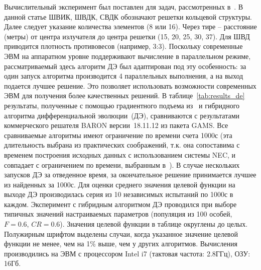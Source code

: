 Вычислительный эксперимент был поставлен для задач, рассмотренных в~\cite{tyu:daor,tyu22:ring}. В данной
статье ШВИК, ШВДК, СВДК обозначают решетки кольцевой структуры. Далее следует указание количества элементов (8 или 16).
Через тире -- расстояние (метры) от центра излучателя до центра решетки (15, 20, 25, 30, 37). Для ШВД приводится плотность противовесов (например, 3:3). Поскольку современные ЭВМ на аппаратном уровне поддерживают вычисление в параллельном режиме, рассматриваемый здесь алгоритм ДЭ был адаптирован под эту особенность: за один запуск алгоритма производится 4 параллельных выполнения, а на выход подается лучшее решение. Это позволяет использовать возможности современных ЭВМ для получения более качественных решений.
В таблице~\ref{tab:results_de} результаты, полученные с помощью градиентного подъема из~\cite{tyu:daor} и гибридного алгоритма дифференциальной эволюции~(ДЭ),
сравниваются с результатами коммерческого решателя BARON версии~18.11.12 из пакета GAMS.
Все сравниваемые алгоритмы имеют ограничение по времени счета 1000с (эта длительность выбрана из практических соображений, т.к. она сопоставима с временем построения исходных данных с использованием системы NEC, и совпадает с ограничением по времени, выбранным в~\cite{tyu:daor}).
В случае нескольких запусков ДЭ за отведенное время, за окончательное решение принимается лучшее из найденных за 1000с.
Для оценки среднего значения целевой функции на выходе ДЭ производилась серия из 10 независимых испытаний по
1000с в каждом. Эксперимент с гибридным алгоритмом ДЭ проводился при выборе типичных значений настраиваемых параметров
(популяция из 100 особей, $F=0.6$, $CR=0.6$). Значения целевой функции в таблице округлены до целых.
Полужирным шрифтом выделены случаи, когда указанное значение целевой функции не менее, чем на 1\% выше, чем у других алгоритмов.
Вычисления производились на ЭВМ с процессором Intel i7 (тактовая частота: 2.8ГГц), ОЗУ: 16Гб.

